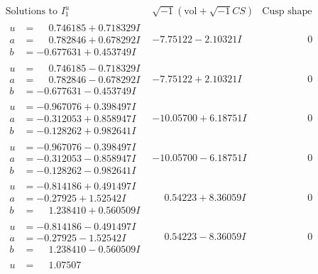\documentclass[1p]{elsarticle_modified}
\theoremstyle{definition}
\newcommand{\I}{\sqrt{-1}}
\begin{document}
$$\begin{array}{c|c|c}  
\text{Solutions to }I^u_{1}& \I (\text{vol} + \sqrt{-1}CS) & \text{Cusp shape}\\
 \hline 
\begin{aligned}
u &= \phantom{-}0.746185 + 0.718329 I \\
a &= \phantom{-}0.782846 + 0.678292 I \\
b &= -0.677631 + 0.453749 I\end{aligned}
 & -7.75122 - 2.10321 I & \phantom{-0.000000 } 0 \\ \hline\begin{aligned}
u &= \phantom{-}0.746185 - 0.718329 I \\
a &= \phantom{-}0.782846 - 0.678292 I \\
b &= -0.677631 - 0.453749 I\end{aligned}
 & -7.75122 + 2.10321 I & \phantom{-0.000000 } 0 \\ \hline\begin{aligned}
u &= -0.967076 + 0.398497 I \\
a &= -0.312053 + 0.858947 I \\
b &= -0.128262 + 0.982641 I\end{aligned}
 & -10.05700 + 6.18751 I & \phantom{-0.000000 } 0 \\ \hline\begin{aligned}
u &= -0.967076 - 0.398497 I \\
a &= -0.312053 - 0.858947 I \\
b &= -0.128262 - 0.982641 I\end{aligned}
 & -10.05700 - 6.18751 I & \phantom{-0.000000 } 0 \\ \hline\begin{aligned}
u &= -0.814186 + 0.491497 I \\
a &= -0.27925 + 1.52542 I \\
b &= \phantom{-}1.238410 + 0.560509 I\end{aligned}
 & \phantom{-}0.54223 + 8.36059 I & \phantom{-0.000000 } 0 \\ \hline\begin{aligned}
u &= -0.814186 - 0.491497 I \\
a &= -0.27925 - 1.52542 I \\
b &= \phantom{-}1.238410 - 0.560509 I\end{aligned}
 & \phantom{-}0.54223 - 8.36059 I & \phantom{-0.000000 } 0 \\ \hline\begin{aligned}
u &= \phantom{-}1.07507\phantom{ +0.000000I} \\

\end{aligned}
\end{array}$$
\end{document}
